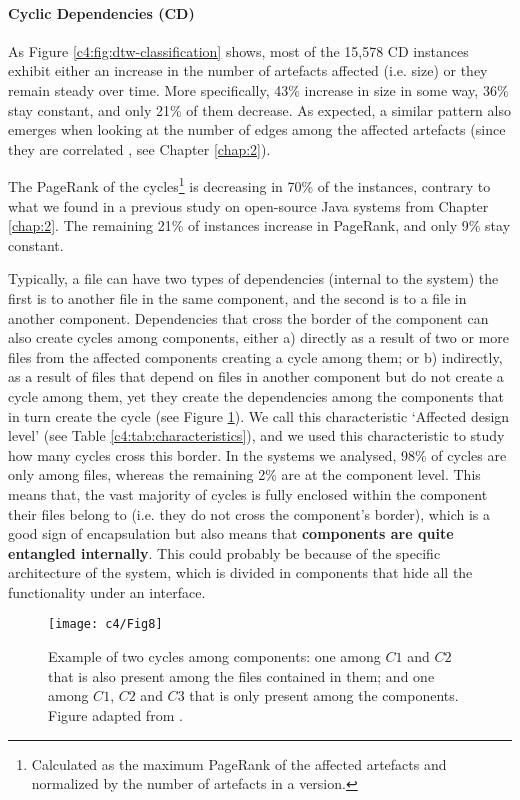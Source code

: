 \paragraph{Cyclic Dependencies (CD)} As Figure \ref{c4:fig:dtw-classification} shows, most of the 15,578 CD instances exhibit either an increase in the number of artefacts affected (i.e. size) or they remain steady over time. More specifically, 43\% increase in size in some way, 36\% stay constant, and only 21\% of them decrease. As expected, a similar pattern also emerges when looking at the number of edges among the affected artefacts (since they are correlated , see Chapter \ref{chap:2}).

The PageRank of the cycles\footnote{Calculated as the maximum PageRank of the affected artefacts and normalized by the number of artefacts in a version.} is decreasing in 70\% of the instances, contrary to what we found in a previous study on open-source Java systems from Chapter \ref{chap:2}.
The remaining 21\% of instances increase in PageRank, and only 9\% stay constant.

Typically, a file can have two types of dependencies (internal to the system) the first is to another file in the same component, and the second is to a file in another component.
Dependencies that cross the border of the component can also create cycles among components, either a) directly as a result of two or more files from the affected components creating a cycle among them; or b) indirectly, as a result of files that depend on files in another component but do not create a cycle among them, yet they create the dependencies among the components that in turn create the cycle (see Figure \ref{c4:fig:package-cycles}). We call this characteristic `Affected design level' (see Table \ref{c4:tab:characteristics}), and we used this characteristic to study how many cycles cross this border.
In the systems we analysed, 98\% of cycles are only among files, whereas the remaining 2\% are at the component level.
This means that, the vast majority of cycles is fully enclosed within the component their files belong to (i.e. they do not cross the component's border), which is a good sign of encapsulation but also means that \textbf{components are quite entangled internally}.
This could probably be because of the specific architecture of the system, which is divided in components that hide all the functionality under an interface.

\begin{figure}
    \centering
    \texttt{[image: c4/Fig8]}
    \caption{Example of two cycles among components: one among $C1$ and $C2$ that is also present among the files contained in them; and one among $C1$, $C2$ and $C3$ that is only present among the components. Figure adapted from \cite{AlMutawa2014}.}
    \label{c4:fig:package-cycles}
\end{figure}

